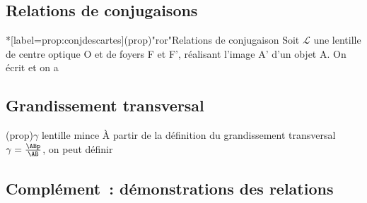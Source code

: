 \documentclass[../../main/main.tex]{subfiles}
\begin{document}
\subsection{Relations de conjugaisons}

\begin{tcb}*[label=prop:conjdescartes](prop)"ror"{Relations de conjugaison}
	Soit $\mathcal{L}$ une lentille de centre optique O et de foyers F
	et F', réalisant l'image A' d'un objet A. On écrit
	et on a
	\smallbreak
	\begin{isd}
		\psw{
			\[
				\boxed{ \frac{1}{\OFp} = \frac{1}{\OAp} - \frac{1}{\OA}}
			\]
		}
		\tcblower
	\end{isd}
\end{tcb}

\subsection{Grandissement transversal}

\begin{tcb}[label=coro:lent_grand](prop){$\gamma$ lentille mince}
	À partir de la définition du grandissement transversal $\gamma =
		\frac{\ABp}{\AB}$, on peut définir

	\begin{isd}
		\psw{
			\[
				\boxed{\gamma = \frac{\ABp}{\AB} = \frac{\OAp}{\OA}}
			\]
		}
		\tcblower
		\psw{
			\[
				\boxed{
					\gamma =
					\frac{\obar{\rm F'A'}}{\obar{\rm F'O}} =
					\frac{\obar{\rm FO}}{\obar{\rm FA}}}
			\]
		}
	\end{isd}
\end{tcb}

\subsection{Complément~: démonstrations des relations}
\end{document}
